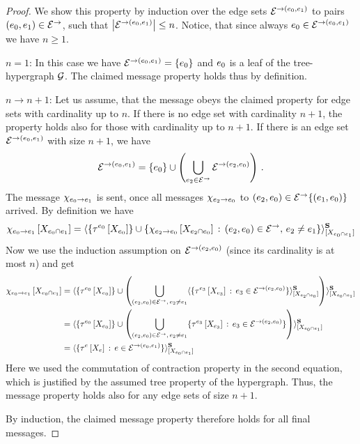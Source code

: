 \begin{proof}
    We show this property by induction over the edge sets $\mathcal{E}^{\rightarrow(e_{0},e_{1})}$ to pairs $(e_{0},e_{1})\in\mathcal{E}^{\rightarrow}$, such that $\left|\mathcal{E}^{\rightarrow(e_{0},e_{1})}\right|\leq n$.
    Notice, that since always $e_{0}\in\mathcal{E}^{\rightarrow(e_{0},e_{1})}$ we have $n\geq1$.

    $n=1$: In this case we have $\mathcal{E}^{\rightarrow(e_{0},e_{1})}=\{e_{0}\}$ and $e_{0}$ is a leaf of the tree-hypergraph $\mathcal{G}$.
    The claimed message property holds thus by definition.

    $n\rightarrow n+1$: Let us assume, that the message obeys the claimed property for edge sets with cardinality up to $n$.
    If there is no edge set with cardinality $n+1$, the property holds also for those with cardinality up to $n+1$.
    If there is an edge set $\mathcal{E}^{\rightarrow(e_{0},e_{1})}$ with size $n+1$, we have
    \begin{align*}
        \mathcal{E}^{\rightarrow(e_{0},e_{1})} = \{e_{0}\} \cup \left(\bigcup_{e_{2} \in\mathcal{E}^{\rightarrow}} \mathcal{E}^{\rightarrow(e_{2},e_{0})}\right) \, .
    \end{align*}
    The message $\chi_{e_{0} \rightarrow e_{1}}$ is sent, once all messages $\chi_{e_{2} \rightarrow e_{0}}$ to $(e_{2},e_{0})\in\mathcal{E}^{\rightarrow}\{(e_{1},e_{0})\}$ arrived.
    By definition we have
    \begin{align*}
        \mesfromtowith{\sedge}{\redge}%
        = \srcontractionof{\{\hypercoreofat{\sedge}{\catvariableof{\sedge}}\}
            \cup \{\mesfromtowith{\secsedge}{\sedge} \wcols (\secsedge,\sedge) \in\dirovedges \ncond \secsedge \neq \redge \}
        }{\catvariableof{\sedge\cap \redge}}
    \end{align*}
    Now we use the induction assumption on $\mathcal{E}^{\rightarrow(e_{2},e_{0})}$ (since its cardinality is at most $n$) and get
    \begin{align*}
        \chi_{e_{0} \rightarrow e_{1}}\left[X_{e_{0}\cap e_{1}}\right]
        &= \langle
            \{\tau^{e_{0}}\left[X_{e_{0}}\right]\} \cup
            \left(\bigcup_{(e_{2},e_{0})\in\mathcal{E}^{\rightarrow} ,\, e_{2}\neq e_{1}}
                \langle\{\tau^{e_{3}}\left[X_{e_{3}}\right] \,:\,  e_{3} \in \mathcal{E}^{\rightarrow(e_{2},e_{0})}\}\rangle^{\mathbf{S}}_{[X_{e_{2}\cap e_{0}}]} \right)
        \rangle^{\mathbf{S}}_{[X_{e_{0}\cap e_{1}}]} \\
        &= \langle
            \{\tau^{e_{0}}\left[X_{e_{0}}\right]\} \cup
            \left(\bigcup_{(e_{2},e_{0})\in\mathcal{E}^{\rightarrow} ,\, e_{2}\neq e_{1}} \{\tau^{e_{3}}\left[X_{e_{3}}\right] \,:\,  e_{3} \in \mathcal{E}^{\rightarrow(e_{2},e_{0})}\} \right)
        \rangle^{\mathbf{S}}_{[X_{e_{0}\cap e_{1}}]} \\
        &= \langle\{\tau^{e}\left[X_{e}\right]\,:\,e\in\mathcal{E}^{\rightarrow(e_{0},e_{1})}\}\rangle^{\mathbf{S}}_{[X_{e_{0}\cap e_{1}}]}
    \end{align*}
    Here we used the commutation of contraction property in the second equation, which is justified by the assumed tree property of the hypergraph.
    Thus, the message property holds also for any edge sets of size $n+1$.

    By induction, the claimed message property therefore holds for all final messages.
\end{proof}

